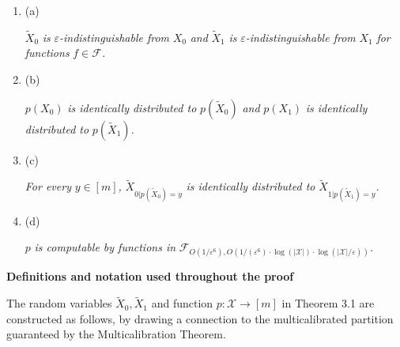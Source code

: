 \begin{enumerate}


\item[] 
(a) 


$\widetilde{X}_{0}$\emph{ is }$\varepsilon$\emph{-indistinguishable from }$X_{0}$\emph{ and }$\widetilde{X}_{1}$\emph{ is }$\varepsilon$\emph{-indistinguishable from }$X_{1}$\emph{ for functions }$f\in\mathcal{F}$\emph{.}\par





\item[] 
(b) 


$p(X_{0})$\emph{ is identically distributed to }$p(\widetilde{X}_{0})$\emph{ and }$p(X_{1})$\emph{ is identically distributed to }$p(\widetilde{X}_{1})$\emph{.}\par





\item[] 
(c) 


\emph{For every }$y\in[m]$\emph{, }$\widetilde{X}_{0|p(\widetilde{X}_{0})=y}$\emph{ is identically distributed to }$\widetilde{X}_{1|p(\widetilde{X}_{1})=y}$\emph{.}\par





\item[] 
(d) 


$p$\emph{ is computable by functions in }$\mathcal{F}_{O(1/\varepsilon^{6}),O(1/(\varepsilon^{6})\cdot\log(|\mathcal{X}|)\cdot\log(|\mathcal{X}|/\varepsilon))}$\emph{.}\par





\end{enumerate}






\par\medskip\noindent\textbf{Definitions and notation used throughout the proof}\par




The random variables $\widetilde{X}_{0},\widetilde{X}_{1}$ and function $p:\mathcal{X}\to[m]$ in Theorem 3.1 are constructed as follows, by drawing a connection to the multicalibrated partition guaranteed by the Multicalibration Theorem.\par



